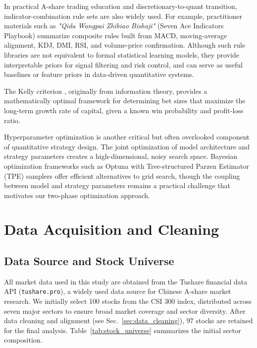 \documentclass[12pt, a4paper]{article}
\begin{document}
In practical A-share trading education and discretionary-to-quant transition, indicator-combination rule sets are also widely used. For example, practitioner materials such as \emph{"Qida Wangpai Zhibiao Bishaji"} (Seven Ace Indicators Playbook) summarize composite rules built from MACD, moving-average alignment, KDJ, DMI, RSI, and volume-price confirmation. Although such rule libraries are not equivalent to formal statistical learning models, they provide interpretable priors for signal filtering and risk control, and can serve as useful baselines or feature priors in data-driven quantitative systems.

The Kelly criterion \citep{kelly1956new}, originally from information theory, provides a mathematically optimal framework for determining bet sizes that maximize the long-term growth rate of capital, given a known win probability and profit-loss ratio.

Hyperparameter optimization is another critical but often overlooked component of quantitative strategy design. The joint optimization of model architecture and strategy parameters creates a high-dimensional, noisy search space. Bayesian optimization frameworks such as Optuna \citep{akiba2019optuna} with Tree-structured Parzen Estimator (TPE) samplers offer efficient alternatives to grid search, though the coupling between model and strategy parameters remains a practical challenge that motivates our two-phase optimization approach.

\section{Data Acquisition and Cleaning} \label{sec:data}

\subsection{Data Source and Stock Universe}

All market data used in this study are obtained from the Tushare financial data API (\texttt{tushare.pro}), a widely used data source for Chinese A-share market research. We initially select 100 stocks from the CSI 300 index, distributed across seven major sectors to ensure broad market coverage and sector diversity. After data cleaning and alignment (see Sec.~\ref{sec:data_cleaning}), 97 stocks are retained for the final analysis. Table~\ref{tab:stock_universe} summarizes the initial sector composition.
\end{document}
